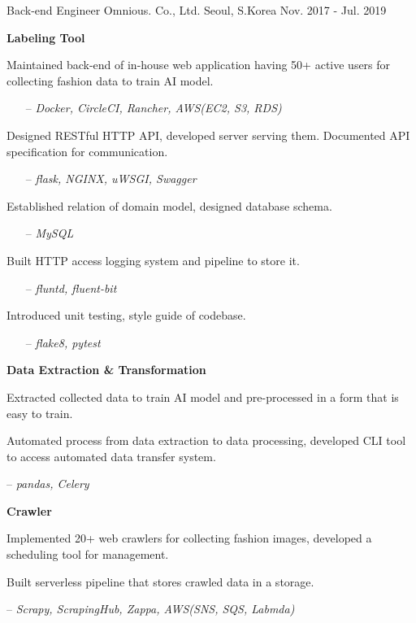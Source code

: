\begin{cventries}
  \cventry
    {Back-end Engineer} %
    {Omnious. Co., Ltd.} %
    {Seoul, S.Korea} %
    {Nov. 2017 - Jul. 2019} %
    {
      \begin{cvitems} %
        \item[] {\textbf{Labeling Tool}}
        \item {Maintained back-end of in-house web application having 50+ active users for collecting fashion data to train AI model.}
        \begin{itemize}
          \item[--] \textit{Docker, CircleCI, Rancher, AWS(EC2, S3, RDS)}
        \end{itemize}
        \item {Designed RESTful HTTP API, developed server serving them. Documented API specification for communication.}
        \begin{itemize}
          \item[--] \textit{flask, NGINX, uWSGI, Swagger}
        \end{itemize}
        \item {Established relation of domain model, designed database schema.}
        \begin{itemize}
          \item[--] \textit{MySQL}
        \end{itemize}
        \item {Built HTTP access logging system and pipeline to store it.}
        \begin{itemize}
          \item[--] \textit{fluntd, fluent-bit}
        \end{itemize}
        \item {Introduced unit testing, style guide of codebase.}
        \begin{itemize}
          \item[--] \textit{flake8, pytest}
        \end{itemize}
        \item[] {\textbf{Data Extraction \& Transformation}}
        \item {Extracted collected data to train AI model and pre-processed in a form that is easy to train.}
        \item {Automated process from data extraction to data processing, developed CLI tool to access automated data transfer system.}
        \item[--] \textit{pandas, Celery}
        \item[] {\textbf{Crawler}}
        \item {Implemented 20+ web crawlers for collecting fashion images, developed a scheduling tool for management.} 
        \item {Built serverless pipeline that stores crawled data in a storage.}
        \item[--] \textit{Scrapy, ScrapingHub, Zappa, AWS(SNS, SQS, Labmda)}
      \end{cvitems}
    }


\end{cventries}
